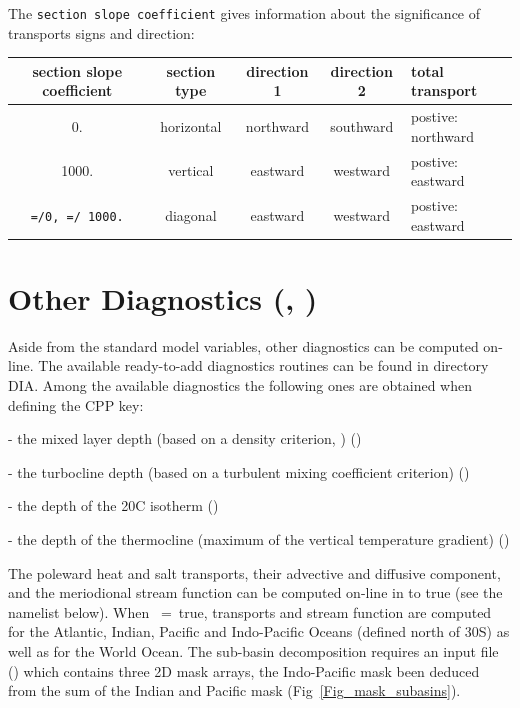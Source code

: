 \noindent The \texttt{section slope coefficient} gives information about the significance of transports signs and direction:\\



\begin{tabular}{|c|c|c|c|p{4cm}|}
\hline
section slope coefficient & section type & direction 1 & direction 2 & total transport \\ \hline
0.    &  horizontal & northward & southward & postive: northward  \\ \hline
1000. &  vertical   & eastward  & westward  & postive: eastward  \\ \hline                
\texttt{=/0, =/ 1000.}   &  diagonal   & eastward  & westward  & postive: eastward  \\ \hline                
\end{tabular}



\section{Other Diagnostics (, )}
\label{DIA_diag_others}


Aside from the standard model variables, other diagnostics can be computed 
on-line. The available ready-to-add diagnostics routines can be found in directory DIA. 
Among the available diagnostics the following ones are obtained when defining 
the  CPP key: 

- the mixed layer depth (based on a density criterion, \citet{de_Boyer_Montegut_al_JGR04}) ()

- the turbocline depth (based on a turbulent mixing coefficient criterion) ()

- the depth of the 20\deg C isotherm ()

- the depth of the thermocline (maximum of the vertical temperature gradient) ()

The poleward heat and salt transports, their advective and diffusive component, and 
the meriodional stream function can be computed on-line in  
 to true (see the \textit{ } namelist below).  
When ~=~true, transports and stream function are computed 
for the Atlantic, Indian, Pacific and Indo-Pacific Oceans (defined north of 30\deg S) 
as well as for the World Ocean. The sub-basin decomposition requires an input file 
() which contains three 2D mask arrays, the Indo-Pacific mask 
been deduced from the sum of the Indian and Pacific mask (Fig~\ref{Fig_mask_subasins}). 


